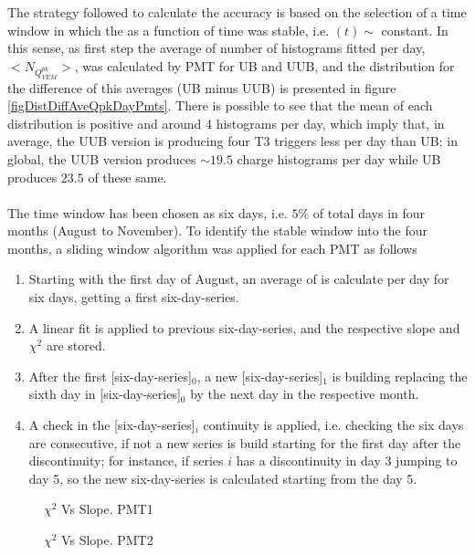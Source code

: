 \documentclass[twoside, final, 10pt]{articleMine}
\begin{document}
The strategy followed to calculate the \qpkvem accuracy is based
on the selection of a time window in which the \qpkvem as a
function of time was stable, i.e. \qpkvem$(t)\sim$ constant. In
this sense, as first step the average of number of histograms
fitted per day, $<N_{Q^{pk}_{VEM}}>$, was calculated by PMT for
UB and UUB, and the distribution for the difference of this
averages (UB minus UUB) is presented in figure
\ref{figDistDiffAveQpkDayPmts}. There is possible to see that the
mean of each distribution is positive and around 4 histograms per 
day, which imply that, in average, the UUB version is producing
four T3 triggers less per day than UB; in global, the UUB version
produces $\sim19.5$ charge histograms per day while UB produces
$23.5$ of these same.\\\\The time window has been chosen as six
days, i.e. $5\%$ of total days in four months (August to
November). To identify the stable window into the four months, a
sliding window algorithm was applied for each PMT as follows
\begin{enumerate}
  \item Starting with the first day of August, an average of
    \qpkvem is calculate per day for six days, getting a first
    six-day-series.
  \item A linear fit is applied to previous six-day-series, and
    the respective slope and $\chi^2$ are stored.
  \item After the first [six-day-series]$_0$, a new
    [six-day-series]$_1$ is building replacing the sixth day in
    [six-day-series]$_0$ by the next day in the respective month.
  \item A check in the [six-day-series]$_i$ continuity is
    applied, i.e. checking the six days are consecutive, if not a
    new series is build starting for the first day after the
    discontinuity; for instance, if series $i$ has a
    discontinuity in day 3 jumping to day 5, so the new
    six-day-series is calculated starting from the day 5.
\end{enumerate}
\newpage

\begin{figure}[!t]
  \centering
  \caption{$\chi^2$ Vs Slope. PMT1}
  \label{figChi2VsSlopPmt1}
\end{figure}

\begin{figure}[!t]
  \centering
  \caption{$\chi^2$ Vs Slope. PMT2}
  \label{figChi2VsSlopPmt2}
\end{figure}
\end{document}
